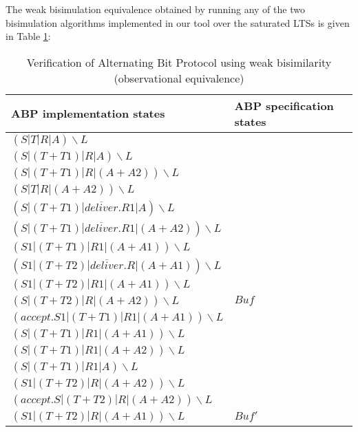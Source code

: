 The weak bisimulation equivalence obtained by running any of the two bisimulation algorithms implemented in our tool over the saturated LTSs is given in Table \ref{table3}:

\begin{table}
\begin{tabular}{| p{6.5cm} | p{3.5cm} | }
	
  \hline                       
	ABP implementation states &
	ABP specification states
	\\ \hline
	
$\left(S|T|R|A\right)\backslash L$ & \\
$\left(S|\left(T+T1\right)|R|A\right)\backslash L$ & \\
$\left(S|\left(T+T1\right)|R|\left(A+A2\right)\right)\backslash L$ & \\
$\left(S|T|R|\left(A+A2\right)\right)\backslash L$ & \\
$\left(S|\left(T+T1\right)|\overline{deliver}.R1|A\right)\backslash L$ & \\
$\left(S|\left(T+T1\right)|\overline{deliver}.R1|\left(A+A2\right)\right)\backslash L$ & \\
$\left(S1|\left(T+T1\right)|R1|\left(A+A1\right)\right)\backslash L$ & \\
$\left(S1|\left(T+T2\right)|\overline{deliver}.R|\left(A+A1\right)\right)\backslash L$ & \\
$\left(S1|\left(T+T2\right)|R1|\left(A+A1\right)\right)\backslash L$ & \\
$\left(S|\left(T+T2\right)|R|\left(A+A2\right)\right)\backslash L$ &
  $\mathit{Buf}$   
  \\ \hline
   
$\left(accept.S1|\left(T+T1\right)|R1|\left(A+A1\right)\right)\backslash L$ & \\ 
$\left(S|\left(T+T1\right)|R1|\left(A+A1\right)\right)\backslash L$ & \\
$\left(S|\left(T+T1\right)|R1|\left(A+A2\right)\right)\backslash L$ & \\
$\left(S|\left(T+T1\right)|R1|A\right)\backslash L$ & \\
$\left(S1|\left(T+T2\right)|R|\left(A+A2\right)\right)\backslash L$ & \\
$\left(accept.S|\left(T+T2\right)|R|\left(A+A2\right)\right)\backslash L$ & \\
$\left(S1|\left(T+T2\right)|R|\left(A+A1\right)\right)\backslash L$ &
  $\mathit{Buf'}$
  \\ \hline  
\end{tabular}
\\
\caption{Verification of Alternating Bit Protocol using weak bisimilarity (observational equivalence)}
\label{table3}
\end{table}
